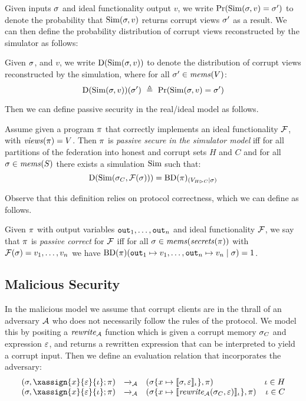 Given inputs $\sigma$ and ideal
functionality output $v$, we write $ \mathrm{Pr}(\mathrm{Sim}(\sigma,v) = \sigma') $
to denote the probability that $\mathrm{Sim}(\sigma,v)$ returns corrupt views
$\sigma'$ as a result. We can then define the probability distribution
of corrupt views reconstructed by the simulator as follows:
\begin{definition}
  Given $\sigma$, and $v$, we write $\mathrm{D}(\mathrm{Sim}(\sigma,v))$ to
  denote the distribution of corrupt views reconstructed by the
  simulation, where for
  all $\sigma' \in \mathit{mems}(V)$:
  $$
  \dist(\SIM(\store,v))(\store')\ \defeq\ \prob(\SIM(\store,v) = \store') 
  $$
\end{definition}
Then we can define passive security in the real/ideal
model as follows. 
\begin{definition}
  Assume given a program $\pi$ that correctly implements an ideal
  functionality $\mathcal{F}$, with $\mathit{views}(\pi) = V$.  Then $\pi$
  is \emph{passive secure in the simulator model} iff for all
  partitions of the federation into honest and corrupt sets $H$ and $C$
  and for all $\sigma \in \mathit{mems}(S)$ there exists a
  simulation $\mathrm{Sim}$ such that:
  $$
  \mathrm{D}(\mathrm{Sim}(\sigma_{C},\mathcal{F}(\sigma))) = \mathrm{BD}(\pi)_{({V_{H \rhd C}}|{\sigma})}
  $$
\end{definition}
Observe that this definition relies on protocol correctness, which
we can define as follows.
\begin{definition}
  Given $\pi$ with output variables $\texttt{out}_{1},\ldots,\texttt{out}_{n}$ and ideal
  functionality $\mathcal{F}$, we say that $\pi$ is \emph{passive correct}
  for $\mathcal{F}$ iff for all $\sigma \in \mathit{mems}(\mathit{secrets}(\pi))$
  with $\mathcal{F}(\sigma) = v_1,\ldots,v_n$ we have
  $\mathrm{BD}(\pi)(\texttt{out}_{1} \mapsto v_1,\ldots,\texttt{out}_{n} \mapsto v_n \mid \sigma) = 1$.
\end{definition}

\subsection{Malicious Security}

In the malicious model we assume that corrupt clients are in the thrall of an
adversary $\mathcal{A}$ who does not necessarily follow the rules of the protocol.
We model this by positing a $\mathit{rewrite}_{\mathcal{A}}$ function which is given a corrupt memory
$\sigma_C$ and expression $\varepsilon$, and returns a rewritten expression that can
be interpreted to yield a corrupt input. Then we define an evaluation
relation that incorporates the adversary:
$$
\begin{array}{rclr}
  (\store, \xassign{x}{\be}{\cid};\prog) &\aredx&
  (\extend{\store}{x}{\lcod{\store,\be}{\cid}}, \prog) & \cid \in H\\
  (\store, \xassign{x}{\be}{\cid};\prog) &\aredx&
  (\extend{\store}{x}{\lcod{\arewrite(\store_C,\be)}{\cid}}, \prog) & \cid \in C
\end{array}
$$

